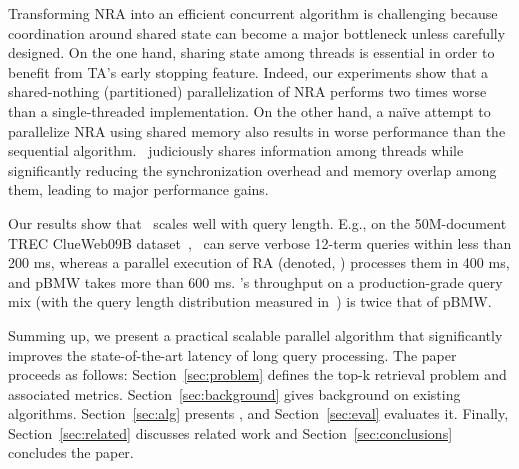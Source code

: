Transforming NRA into an efficient concurrent algorithm is challenging because coordination around 
shared state can become a major bottleneck unless carefully designed. On the one hand,
sharing state among threads is essential in order to benefit from TA's early stopping feature.
Indeed, our experiments show  that a shared-nothing (partitioned) parallelization of NRA performs two times 
worse than a single-threaded implementation. On the other hand, 
a na\"ive attempt to parallelize NRA using shared memory also results in 
worse performance than the sequential algorithm. \alg\ judiciously shares 
information among threads while significantly reducing the synchronization 
overhead and memory overlap among them, 
leading to major performance gains. 

Our results show that \alg\ scales well with 
query length.
E.g., on the 50M-document TREC ClueWeb09B dataset~\cite{ClueWeb09}, %
\alg\ can serve verbose 12-term queries within less than 200 ms, 
whereas a parallel execution of RA (denoted, \pRA) processes them in 400 ms, and pBMW takes more than 600 ms. 
\alg's throughput on a production-grade query mix (with the query length distribution measured in~\cite{sigir/Guy16}) is twice that of pBMW.

Summing up, we present a practical scalable parallel algorithm that significantly improves the state-of-the-art latency  of long query processing.
%
The paper proceeds as follows: Section~\ref{sec:problem} defines the top-k retrieval problem and associated metrics. 
Section~\ref{sec:background} gives background on existing algorithms. 
Section~\ref{sec:alg} presents \alg, and Section~\ref{sec:eval}  evaluates it.
Finally, 
Section~\ref{sec:related} discusses related work and Section~\ref{sec:conclusions} concludes the paper.